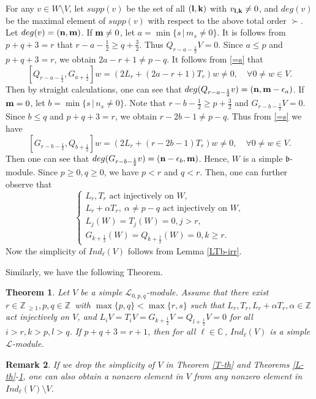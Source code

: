 \documentclass[12pt]{article}
\def\a{\alpha}
\def\ssc{\scriptscriptstyle}
\def\Z{\mathbb{Z}{\ssc\,}}
\def\C{\mathbb{C}{\ssc\,}}
\numberwithin{equation}{section}
\newtheorem{theo}{Theorem}[section]
\newtheorem{rema}[theo]{Remark}
\begin{document}
 For any $v\in W\setminus V$, let $supp(v)$ be the set of all $(\bf l,k)$ with $v_{\bf l,k}\ne 0$, and $deg(v)$ be the maximal element of $supp(v)$ with respect to the above  total order $\succ$.  Let $deg(v)=(\bf n,m)$.
If ${\bf m}\ne 0$, let $a=\min\{s\,|\,m_s\ne 0\}$. It is follows from $p+q+3=r$ that  $r-a-\frac{1}{2}\ge q+\frac{3}{2}$. Thus $Q_{r-a-\frac{1}{2}}V=0$. Since $a\le p$ and $p+q+3=r$, we obtain $2a-r+1\ne p-q$. It follows from \eqref{=s} that
 $$[Q_{r-a-\frac{1}{2}}, G_{a+\frac{1}{2}}]w=(2L_r+(2a-r+1)T_r)w\ne 0,\quad \forall 0\ne  w\in V.$$
 Then by straight calculations, one can see that $deg(Q_{r-a-\frac{1}{2}}v)=({\bf n, m}-\epsilon_a)$. If ${\bf m}=0$, let $b=\min\{s\,|\,n_s\ne 0\}$. Note that $r-b-\frac{1}{2}\ge p+\frac{3}{2}$ and $G_{r-b-\frac{1}{2}}V=0$.
  Since $b\le q$ and $p+q+3=r$, we obtain  $r-2b -1\ne p-q$. Thus from \eqref{=s} we have
 $$[G_{r-b-\frac{1}{2}}, Q_{b+\frac{1}{2}}]w=(2L_r+(r-2b-1)T_r)w\ne 0,\quad \forall 0\ne  w\in V.$$ Then one can see that $deg(G_{r-b-\frac{1}{2}}v)=({\bf n}-\epsilon_b,{\bf m})$. Hence,  $W$ is a simple $\mathfrak{b}$-module. Since  $p\ge 0,q\ge 0$, we have $p<r$ and $q<r$.
Then, one can further observe that
\begin{equation}\label{=sirr}\left\{\begin{array}{l}
 L_r, T_r \mbox{ act injectively on } W,\\
  L_r+\a T_r,\ \a\ne p-q \mbox{ act injectively on } W,\\
L_j(W)=T_j(W)=0,j>r,\\
 G_{k+\frac{1}{2}}(W)= Q_{k+\frac{1}{2}}(W)=0, k\ge r.\end{array}
\right.
\end{equation}
Now the simplicity of $Ind_\ell(V)$  follows from Lemma \ref{LTb-irr}.



Similarly,  we have the following Theorem.

\begin{theo} \label{LT-th-r+1}Let $V$ be a simple $\mathcal{L}_{0,p,q}$-module. Assume that there exist $r\in\Z_{\ge 1}, p,q\in\Z$ with $\max\{p,q\}<\max\{r,s\}$  such that $L_r,T_r, L_r+\a T_r, \a\in\Z$ act injectively on $V$, and $L_iV=T_iV=G_{k+\frac{1}{2}}V=Q_{l+\frac{1}{2}}V=0$ for all $i>r,k>p,l>q$.
If  $p+q+3=r+1$, then for all $\ell\in\C$, $Ind_\ell(V)$ is a simple $\mathcal{L}$-module.
\end{theo}

\begin{rema}\label{need-irr} If we drop the simplicity of $V$ in Theorem \ref{T-th} and  Theorems \ref{L-th}-\ref{LT-th-r+1}, one can also obtain a nonzero element in $V$ from any nonzero element in $Ind_\ell(V)\setminus V$.
\end{rema}
\end{document}
